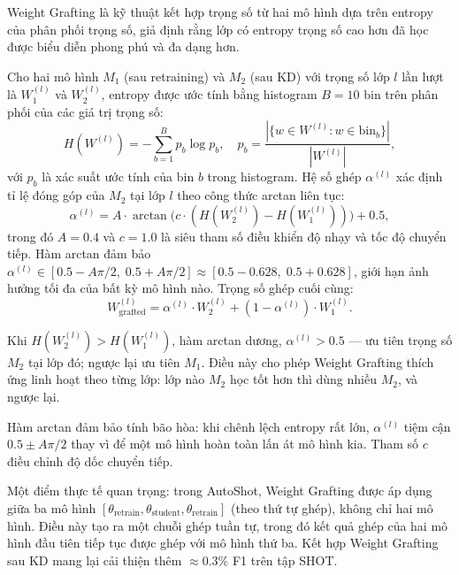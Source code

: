 Weight Grafting là kỹ thuật kết hợp trọng số từ hai mô hình dựa trên entropy của phân phối trọng số, giả định rằng lớp có entropy trọng số cao hơn đã học được biểu diễn phong phú và đa dạng hơn.

Cho hai mô hình $M_1$ (sau retraining) và $M_2$ (sau KD) với trọng số lớp $l$ lần lượt là $W_1^{(l)}$ và $W_2^{(l)}$, entropy được ước tính bằng histogram $B = 10$ bin trên phân phối của các giá trị trọng số:
\begin{equation}
    H(W^{(l)}) = -\sum_{b=1}^{B} p_b \log p_b, \quad p_b = \frac{|\{w \in W^{(l)} : w \in \mathrm{bin}_b\}|}{|W^{(l)}|},
    \label{eq:weight_entropy}
\end{equation}
với $p_b$ là xác suất ước tính của bin $b$ trong histogram. Hệ số ghép $\alpha^{(l)}$ xác định tỉ lệ đóng góp của $M_2$ tại lớp $l$ theo công thức arctan liên tục:
\begin{equation}
    \alpha^{(l)} = A \cdot \arctan\!\bigl(c \cdot (H(W_2^{(l)}) - H(W_1^{(l)}))\bigr) + 0.5,
    \label{eq:grafting_alpha}
\end{equation}
trong đó $A = 0.4$ và $c = 1.0$ là siêu tham số điều khiển độ nhạy và tốc độ chuyển tiếp. Hàm arctan đảm bảo $\alpha^{(l)} \in [0.5 - A\pi/2,\; 0.5 + A\pi/2] \approx [0.5 - 0.628,\; 0.5 + 0.628]$, giới hạn ảnh hưởng tối đa của bất kỳ mô hình nào. Trọng số ghép cuối cùng:
\begin{equation}
    W_{\mathrm{grafted}}^{(l)} = \alpha^{(l)} \cdot W_2^{(l)} + (1 - \alpha^{(l)}) \cdot W_1^{(l)}.
    \label{eq:grafting}
\end{equation}

Khi $H(W_2^{(l)}) > H(W_1^{(l)})$, hàm arctan dương, $\alpha^{(l)} > 0.5$ — ưu tiên trọng số $M_2$ tại lớp đó; ngược lại ưu tiên $M_1$. Điều này cho phép Weight Grafting thích ứng linh hoạt theo từng lớp: lớp nào $M_2$ học tốt hơn thì dùng nhiều $M_2$, và ngược lại.

Hàm arctan đảm bảo tính bão hòa: khi chênh lệch entropy rất lớn, $\alpha^{(l)}$ tiệm cận $0.5 \pm A\pi/2$ thay vì để một mô hình hoàn toàn lấn át mô hình kia. Tham số $c$ điều chỉnh độ dốc chuyển tiếp.

Một điểm thực tế quan trọng: trong AutoShot, Weight Grafting được áp dụng giữa ba mô hình $[\theta_{\mathrm{retrain}}, \theta_{\mathrm{student}}, \theta_{\mathrm{retrain}}]$ (theo thứ tự ghép), không chỉ hai mô hình. Điều này tạo ra một chuỗi ghép tuần tự, trong đó kết quả ghép của hai mô hình đầu tiên tiếp tục được ghép với mô hình thứ ba. Kết hợp Weight Grafting sau KD mang lại cải thiện thêm $\approx 0.3\%$ F1 trên tập SHOT.

